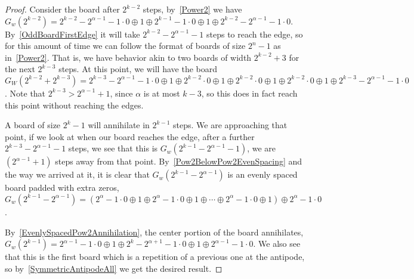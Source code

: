 \documentclass[12pt,letterpaper]{article}
\begin{document}
\begin{proof} %
  Consider the board after $2^{k-2}$ steps, by~\cref{Power2} we have $G_w(2^{k-2})=2^{k-2}-2^{\alpha-1}-1\cdot 0\oplus 1\oplus 2^{k-1}-1\cdot 0 \oplus 1\oplus 2^{k-2}-2^{\alpha-1}-1\cdot 0$. By~\cref{OddBoardFirstEdge} it will take $2^{k-2}-2^{\alpha-1}-1$ steps to reach the edge, so for this amount of time we can follow the format of boards of size $2^n-1$ as in~\cref{Power2}. That is, we have behavior akin to two boards of width $2^{k-2}+3$ for the next $2^{k-3}$ steps. At this point, we will have the board $G_W(2^{k-2}+2^{k-3}) = 2^{k-3}-2^{\alpha-1}-1\cdot 0 \oplus 1\oplus 2^{k-2}\cdot 0\oplus 1\oplus 2^{k-2}\cdot 0\oplus 1\oplus 2^{k-2}\cdot 0\oplus 1\oplus 2^{k-3}-2^{\alpha-1}-1\cdot 0$. Note that $2^{k-3}>2^{\alpha-1}+1$, since $\alpha$ is at most $k-3$, so this does in fact reach this point without reaching the edges.
  
  A board of size $2^k-1$ will annihilate in $2^{k-1}$ steps. We are approaching that point, if we look at when our board reaches the edge, after a further $2^{k-3}-2^{\alpha-1}-1$ steps, we see that this is $G_w(2^{k-1}-2^{\alpha-1}-1)$, we are $(2^{\alpha-1}+1)$ steps away from that point. By~\cref{Pow2BelowPow2EvenSpacing} and the way we arrived at it, it is clear that $G_w(2^{k-1}-2^{\alpha-1})$ is an evenly spaced board padded with extra zeros, $G_w(2^{k-1}-2^{\alpha-1})=(2^\alpha-1\cdot 0\oplus 1\oplus2^\alpha-1\cdot 0\oplus 1\oplus\cdots\oplus2^\alpha-1\cdot 0\oplus 1)\oplus 2^\alpha-1\cdot 0$. 

  By~\cref{EvenlySpacedPow2Annihilation}, the center portion of the board annihilates, $G_w(2^{k-1})=2^{\alpha-1}-1\cdot 0\oplus 1\oplus 2^k-2^{\alpha+1}-1\cdot 0\oplus 1\oplus 2^{\alpha-1}-1\cdot 0$. We also see that this is the first board which is a repetition of a previous one at the antipode, so by~\cref{SymmetricAntipodeAll} we get the desired result. 
\end{proof}
\end{document}
